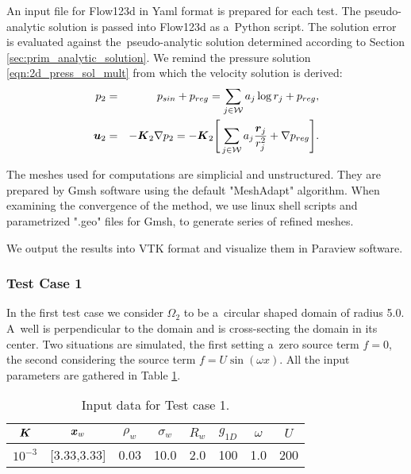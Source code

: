 An input file for Flow123d in Yaml format is prepared for each test.
The pseudo-analytic solution is passed into Flow123d as a~Python script.
The solution error is evaluated against the~pseudo-analytic solution determined according
to Section \ref{sec:prim_analytic_solution}. We remind the pressure solution \eqref{eqn:2d_press_sol_mult} from which the velocity solution is derived:
\begin{eqnarray}
p_2 &=& p_{sin} + p_{reg} = \sum\limits_{j\in\mathcal{W}} a_j\log r_j + p_{reg}, \label{eqn:2d_press_solution}\\
\mathbf{\boldsymbol{u}}_2 &=& -\mathbf{\boldsymbol{K}}_2 \nabla p_2 = - \mathbf{\boldsymbol{K}}_2 \Bigg[ \sum\limits_{j\in\mathcal{W}} a_j\frac{\mathbf{\boldsymbol{r}}_j}{r_j^2} + \nabla p_{reg} \Bigg].  \label{eqn:2d_vel_solution}
\end{eqnarray}

The meshes used for computations are simplicial and unstructured.
They are prepared by Gmsh software using the default "MeshAdapt" algorithm.
When examining the convergence of the method, we use linux shell scripts and parametrized ".geo" files for Gmsh,
to generate series of refined meshes.

We output the results into VTK format and visualize them in Paraview software. 

\subsubsection{Test Case 1}
In the first test case we consider $\Omega_2$ to be a~circular shaped domain of radius 5.0.
A~well is perpendicular to the domain and is cross-secting the domain in its center.
Two situations are simulated, the first setting a~zero source term $f=0$,
the second considering the source term $f=U\sin(\omega x)$.
All the input parameters are gathered in Table \ref{tab:tc1_data}.
%
\begin{table}[!hb]
\begin{center}
\begin{tabular}{cccccccc}
\toprule
$\mathbf{\boldsymbol{K}}$ & $\mathbf{\boldsymbol{x}}_w$  & $\rho_w$ & $\sigma_w$ & $R_w$ & $g_{1D}$ & $\omega$ & $U$ \\
\midrule
$10^{-3}$ & [3.33,3.33] & 0.03 & 10.0 & 2.0 & 100 & 1.0 & 200\\
\bottomrule
\end{tabular}
\caption{Input data for Test case 1.}
\label{tab:tc1_data}
\end{center}
\end{table}

